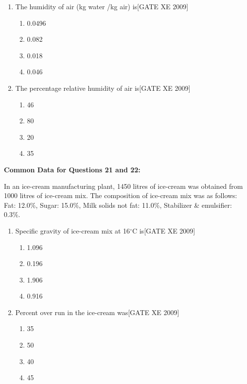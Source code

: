 \documentclass[journal,12pt,onecolumn]{IEEEtran}
\theoremstyle{remark}
\begin{document}
\begin{enumerate}[label=\textbf{Q.\arabic*.}, wide=0pt, leftmargin=*]
\item The humidity of air (kg water /kg air) is\hfill[GATE XE 2009]

\begin{multicols}{2}
\begin{enumerate}
\item 0.0496
\item 0.082
\item 0.018
\item 0.046
\end{enumerate}
\end{multicols}

\item The percentage relative humidity of air is\hfill[GATE XE 2009]

\begin{multicols}{2}
\begin{enumerate}
\item 46
\item 80
\item 20
\item 35
\end{enumerate}
\end{multicols}

\end{enumerate}
\textbf{Common Data for Questions 21 and 22:}

\vspace{0.5em}
In an ice-cream manufacturing plant, 1450 litres of ice-cream was obtained from 1000 litres of ice-cream mix.
The composition of ice-cream mix was as follows: 
Fat: 12.0\%, \quad Sugar: 15.0\%, \quad Milk solids not fat: 11.0\%, \quad Stabilizer \& emulsifier: 0.3\%.

\begin{enumerate}[start=21, label=\textbf{Q.\arabic*.}, wide=0pt, leftmargin=*]

\item Specific gravity of ice-cream mix at 16$^\circ$C is\hfill[GATE XE 2009]

\begin{multicols}{2}
\begin{enumerate}
\item 1.096
\item 0.196
\item 1.906
\item 0.916
\end{enumerate}
\end{multicols}

\item Percent over run in the ice-cream was\hfill[GATE XE 2009]

\begin{multicols}{2}
\begin{enumerate}
\item 35
\item 50
\item 40
\item 45
\end{enumerate}
\end{multicols}

\end{enumerate}
\end{document}
